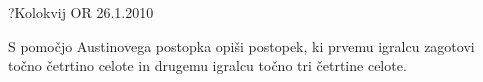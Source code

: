 \begin{naloga}{?}{Kolokvij OR 26.1.2010}
\begin{vprasanje}
S pomočjo Austinovega postopka opiši postopek,
ki prvemu igralcu zagotovi točno četrtino celote
in drugemu igralcu točno tri četrtine celote.
\end{vprasanje}
\begin{odgovor}
\end{odgovor}
\end{naloga}
